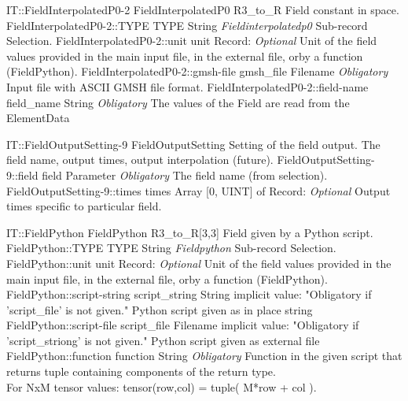 \begin{RecordType}
	{IT::FieldInterpolatedP0-2}
	{FieldInterpolatedP0}
	{} %
	{} %
	{{{R3{\_}to{\_}R Field constant in space.}}}
		\RecKey
			{FieldInterpolatedP0-2::TYPE}
			{TYPE}
			{{String}}
			{ \it{Fieldinterpolatedp0} }
			{{{Sub-record Selection.}}}
		\RecKey
			{FieldInterpolatedP0-2::unit}
			{unit}
			{{Record}{: }}
			{ \it{Optional} }
			{{{Unit of the field values provided in the main input file, in the external file, orby a function (FieldPython).}}}
		\RecKey
			{FieldInterpolatedP0-2::gmsh-file}
			{gmsh{\_}file}
			{{Filename}}
			{ \it{Obligatory} }
			{{{Input file with ASCII GMSH file format.}}}
		\RecKey
			{FieldInterpolatedP0-2::field-name}
			{field{\_}name}
			{{String}}
			{ \it{Obligatory} }
			{{{The values of the Field are read from the }\ttfamily {\$}ElementData}}
\end{RecordType}
\begin{RecordType}
	{IT::FieldOutputSetting-9}
	{FieldOutputSetting}
	{} %
	{} %
	{{{Setting of the field output. The field name, output times, output interpolation (future).}}}
		\RecKey
			{FieldOutputSetting-9::field}
			{field}
			{{Parameter}}
			{ \it{Obligatory} }
			{{{The field name (from selection).}}}
		\RecKey
			{FieldOutputSetting-9::times}
			{times}
			{{Array [0, UINT] of }{Record}{: }}
			{ \it{Optional} }
			{{{Output times specific to particular field.}}}
\end{RecordType}
\begin{RecordType}
	{IT::FieldPython}
	{FieldPython}
	{} %
	{} %
	{{{R3{\_}to{\_}R[3,3] Field given by a Python script.}}}
		\RecKey
			{FieldPython::TYPE}
			{TYPE}
			{{String}}
			{ \it{Fieldpython} }
			{{{Sub-record Selection.}}}
		\RecKey
			{FieldPython::unit}
			{unit}
			{{Record}{: }}
			{ \it{Optional} }
			{{{Unit of the field values provided in the main input file, in the external file, orby a function (FieldPython).}}}
		\RecKey
			{FieldPython::script-string}
			{script{\_}string}
			{{String}}
			{implicit value: "{Obligatory if 'script{\_}file' is not given.}"}
			{{{Python script given as in place string}}}
		\RecKey
			{FieldPython::script-file}
			{script{\_}file}
			{{Filename}}
			{implicit value: "{Obligatory if 'script{\_}striong' is not given.}"}
			{{{Python script given as external file}}}
		\RecKey
			{FieldPython::function}
			{function}
			{{String}}
			{ \it{Obligatory} }
			{{{Function in the given script that returns tuple containing components of the return type.}\\{
For NxM tensor values: tensor(row,col) = tuple( M*row + col ).}}}
\end{RecordType}
